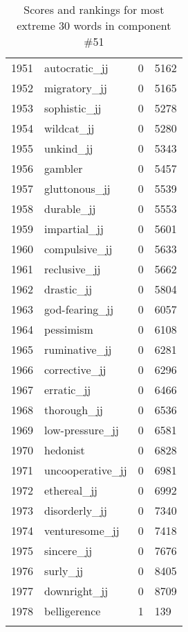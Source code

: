 \begin{longtable}[!htbp]{| rlr@{.}l |}
    1951 & autocratic\_jj & 0 & 5162 \\
    1952 & migratory\_jj & 0 & 5165 \\
    1953 & sophistic\_jj & 0 & 5278 \\
    1954 & wildcat\_jj & 0 & 5280 \\
    1955 & unkind\_jj & 0 & 5343 \\
    1956 & gambler & 0 & 5457 \\
    1957 & gluttonous\_jj & 0 & 5539 \\
    1958 & durable\_jj & 0 & 5553 \\
    1959 & impartial\_jj & 0 & 5601 \\
    1960 & compulsive\_jj & 0 & 5633 \\
    1961 & reclusive\_jj & 0 & 5662 \\
    1962 & drastic\_jj & 0 & 5804 \\
    1963 & god-fearing\_jj & 0 & 6057 \\
    1964 & pessimism & 0 & 6108 \\
    1965 & ruminative\_jj & 0 & 6281 \\
    1966 & corrective\_jj & 0 & 6296 \\
    1967 & erratic\_jj & 0 & 6466 \\
    1968 & thorough\_jj & 0 & 6536 \\
    1969 & low-pressure\_jj & 0 & 6581 \\
    1970 & hedonist & 0 & 6828 \\
    1971 & uncooperative\_jj & 0 & 6981 \\
    1972 & ethereal\_jj & 0 & 6992 \\
    1973 & disorderly\_jj & 0 & 7340 \\
    1974 & venturesome\_jj & 0 & 7418 \\
    1975 & sincere\_jj & 0 & 7676 \\
    1976 & surly\_jj & 0 & 8405 \\
    1977 & downright\_jj & 0 & 8709 \\
    1978 & belligerence & 1 & 139 \\
    \hline
    \caption{Scores and rankings for most extreme 30 words in component \#51} \\
\end{longtable}
